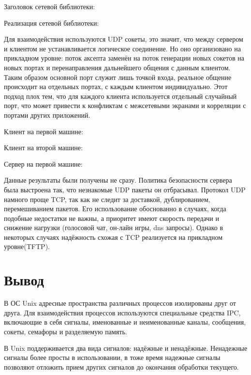 \documentclass[a4paper]{article}
\begin{document}
	Заголовок сетевой библиотеки:
	
	
	Реализация сетевой библиотеки:
		
	
	Для взаимодействия используются UDP сокеты, это значит, что между сервером и клиентом не устанавливается логическое соединение. Но оно организовано на прикладном уровне: поток аксепта заменён на поток генерации новых сокетов на новых портах и перенаправления дальнейшего общения с данным клиентом. Таким образом основной порт служит лишь точкой входа, реальное общение происходит на отдельных портах, с каждым клиентом индивидуально. Этот подход плох тем, что для каждого клиента используется отдельный случайный порт, что может привести к конфликтам с межсетевыми экранами и корреляции с портами других приложений. 
	
	Клиент на первой машине:
	
	
	Клиент на второй машине:
	
	
	Сервер на первой машине:
	
	
	Данные результаты были получены не сразу. Политика безопасности сервера была выстроена так, что незнакомые UDP пакеты он отбрасывал.	
	Протокол UDP намного проще TCP, так как не следит за доставкой, дублированием, перемешиванием пакетов. Его использование обоснованно в случаях, когда подобные недостатки не важны, а приоритет имеют скорость передачи и снижение нагрузки (голосовой чат, он-лайн игры, dns запросы). Однако в некоторых случаях надёжность схожая с TCP реализуется на прикладном уровне(TFTP).
	
\section{Вывод}
	В ОС Unix адресные пространства различных процессов изолированы друг от друга. Для взаимодействия процессов используются специальные средства IPC, включающие в себя сигналы, именованные и неименованные каналы, сообщения, сокеты, семафоры и разделяемую память.
	
	В Unix поддерживается два вида сигналов: надёжные и ненадёжные. Ненадежные сигналы более просты в использовании, в тоже время надежные сигналы позволяют отложить прием других сигналов до окончания обработки текущего.
	
\end{document}
